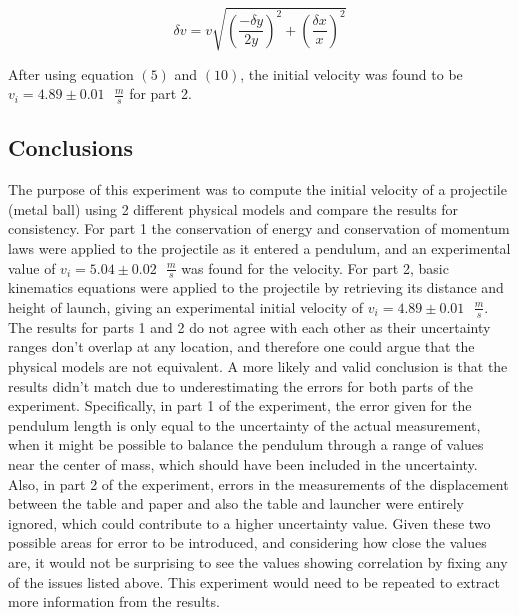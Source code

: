 \documentclass[11pt]{article}
\begin{document}
\begin{equation}
\delta v = v \sqrt{(\frac{-\delta y}{2y})^2 + (\frac{\delta x}{x})^2}
\end{equation}

After using equation \((5)\) and \((10)\), the initial velocity was found
to be \(v_i = 4.89 \pm 0.01\text{ }\frac {m}{s}\) for part 2.

\hypertarget{conclusions}{%
\subsection*{\centering Conclusions}\label{conclusions}}

The purpose of this experiment was to compute the initial velocity of a
projectile (metal ball) using 2 different physical models and compare
the results for consistency. For part 1 the conservation of energy and
conservation of momentum laws were applied to the projectile as it
entered a pendulum, and an experimental value of
\(v_i = 5.04 \pm 0.02\text{ }\frac {m}{s}\) was found for the velocity.
For part 2, basic kinematics equations were applied to the projectile by
retrieving its distance and height of launch, giving an experimental
initial velocity of \(v_i = 4.89 \pm 0.01\text{ }\frac {m}{s}\). The
results for parts 1 and 2 do not agree with each other as their
uncertainty ranges don't overlap at any location, and therefore one
could argue that the physical models are not equivalent. A more likely
and valid conclusion is that the results didn't match due to
underestimating the errors for both parts of the experiment.
Specifically, in part 1 of the experiment, the error given for the
pendulum length is only equal to the uncertainty of the actual
measurement, when it might be possible to balance the pendulum through a
range of values near the center of mass, which should have been included
in the uncertainty. Also, in part 2 of the experiment, errors in the
measurements of the displacement between the table and paper and also the table
and launcher were entirely ignored, which could contribute to a
higher uncertainty value. Given these two possible areas for error to be introduced,
and considering how close the values are, it would not be surprising to
see the values showing correlation by fixing any of the issues listed
above. This experiment would need to be repeated to extract more information from
the results.


    
    
    
\end{document}
